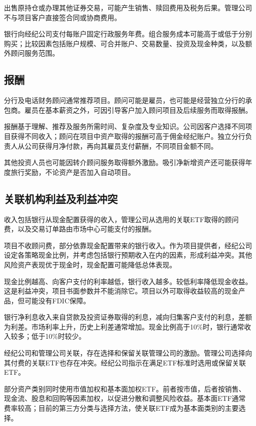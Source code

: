 \documentclass[UTF8,fontset=none,11pt,a4paper]{ctexart}
\begin{document}
出售原持仓或办理其他证券交易，可能产生销售、赎回费用及税务后果。管理公司不与项目客户直接签合同或\allowbreak\mbox{协商费用。}


银行向经纪公司支付每账户固定行政服务年费。组合服务成本可能高于或低于分别购买；比较因素包括账户规模、可合并账户、交易数量、投资及现金种类，以及额外顾问\allowbreak\mbox{服务范围。}


\subsection*{报酬}
分行及电话财务顾问通常推荐项目。顾问可能是雇员，也可能是经营独立分行的承包商。雇员在基本薪资之外，可因引导客户加入顾问项目及后续服务而\allowbreak\mbox{取得报酬。}


报酬基于理解、推荐及服务所需时间、复杂度及专业知识。公司因客户选择不同项目获得不同收入；顾问在项目中资产取得的报酬可高于佣金经纪账户。独立分行负责人从公司获得月净付款，再向其雇员支付薪酬，不同项目\allowbreak\mbox{金额不同。}


其他投资人员也可能因转介顾问服务取得额外激励。吸引净新增资产还可能获得年度旅行奖励，不论资产是否加入\allowbreak\mbox{自动项目。}


\subsection*{关联机构利益及利益冲突}
收入包括银行从现金配置获得的收入，管理公司从选用的关联ETF取得的顾问费，以及交易订单路由市场中心可能支\allowbreak\mbox{付的报酬。}


项目不收顾问费，部分依靠现金配置带来的银行收入。作为项目提供者，经纪公司设定各策略现金比例，并考虑包括银行预期收入在内的因素，形成利益冲突。其他风险资产表现优于现金时，现金配置可能降低\allowbreak\mbox{总体表现。}


现金比例越高、向客户支付的利率越低，银行收入越多。较低利率降低现金收益。这是利益冲突，项目书面参数并不能消除它。项目以外可取得收益较高的现金产品，但可能没有FDIC保障。


银行净利息收入来自贷款及投资证券取得的利息，减向归集客户支付的利息，差额为利差。市场利率上升，历史上利差通常增加。现金比例高于10\%时，银行通常收入较多；低于10\%时较少。


经纪公司和管理公司关联，存在选择和保留关联管理公司的激励。管理公司选择向其付费的关联ETF也存在冲突。经纪公司指示在满足ETF标准时选用或保留关联ETF。


部分资产类别同时使用市值加权和基本面加权ETF。前者按市值，后者按销售、现金流、股息和回购等因素加权，以促进分散和调整风险收益。基本面ETF通常费率较高；目前的第三方分类与选择方法，使关联ETF成为基本面类别的\allowbreak\mbox{主要选择。}
\end{document}
